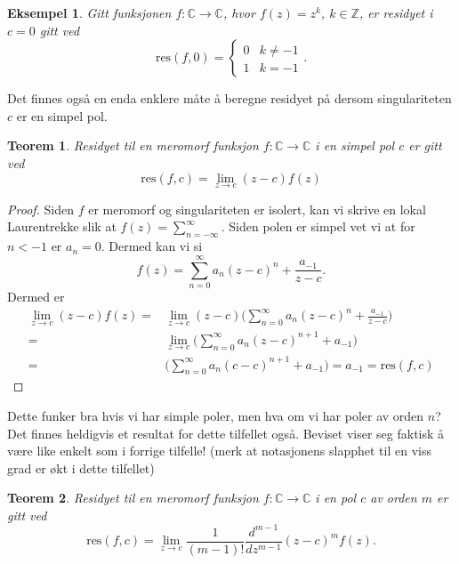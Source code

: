 \documentclass{article}
\newtheorem{theorem}{Teorem}
\newtheorem{example}{Eksempel}
\begin{document}
\begin{example}
    Gitt funksjonen $f:\mathbb{C} \longrightarrow \mathbb{C}$, hvor $f(z) = z^k$, $k\in\mathbb{Z}$, er residyet i $c = 0$ gitt ved \[
        \mathrm{res}(f, 0) = \begin{cases}
            0 & k \neq -1 \\
            1 & k = -1
        \end{cases}.
    \]
\end{example}

Det finnes også en enda enklere måte å beregne residyet på dersom singulariteten $c$ er en simpel pol.

\begin{theorem}
    Residyet til en meromorf funksjon $f:\mathbb{C} \longrightarrow \mathbb{C}$ i en simpel pol $c$ er gitt ved 
    \[
        \mathrm{res}(f, c) = \lim_{z \to c} (z - c) f(z)
    \]
\end{theorem}

\begin{proof}
    Siden $f$ er meromorf og singulariteten er isolert, kan vi skrive en lokal Laurentrekke slik at $f(z) = \sum_{n=-\infty}^{\infty}$. Siden polen er simpel vet vi at for $n < -1$ er $a_n = 0$. Dermed kan vi si 
    \[
        f(z) = \sum_{n=0}^{\infty} a_n(z - c)^n + \frac{a_{-1}}{z - c}.
    \]
    Dermed er 
    \begin{align}
        \lim_{z \to c} (z - c)f(z) =& \lim_{z \to c} (z - c) \bigg( \sum_{n=0}^{\infty}a_n(z - c)^n + \frac{a_{-1}}{z - c} \bigg) \\
        = &  \lim_{z \to c} \bigg( \sum_{n=0}^{\infty}a_n(z - c)^{n+1} + a_{-1} \bigg) \\
        = & \bigg( \sum_{n=0}^{\infty}a_n(c - c)^{n+1} + a_{-1} \bigg)
        = a_{-1}
        = \mathrm{res}(f, c)
    \end{align}
\end{proof}

Dette funker bra hvis vi har simple poler, men hva om vi har poler av orden $n$? Det finnes heldigvis et resultat for dette tilfellet også. Beviset viser seg faktisk å være like enkelt som i forrige tilfelle! (merk at notasjonens slapphet til en viss grad er økt i dette tilfellet)

\begin{theorem}
    Residyet til en meromorf funksjon $f:\mathbb{C} \longrightarrow \mathbb{C}$ i en pol $c$ av orden $m$ er gitt ved 
    \[
        \mathrm{res}(f, c) = \lim_{z \to c} \frac{1}{(m - 1)!} \frac{d^{m - 1}}{dz^{m - 1}} (z - c)^m f(z).
    \]
\end{theorem}
\end{document}
